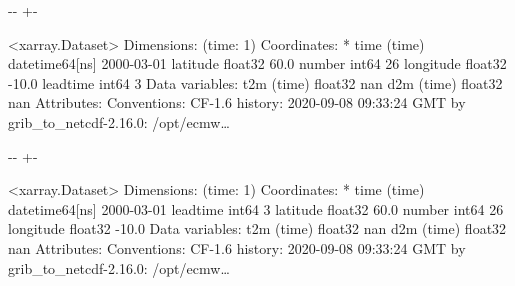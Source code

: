 \documentclass[letterpaper,10pt,english]{sphinxmanual}
\newlength\nbsphinxcodecellspacing
\begin{document}
{

\kern-\sphinxverbatimsmallskipamount\kern-\baselineskip
\kern+\FrameHeightAdjust\kern-\fboxrule
\vspace{\nbsphinxcodecellspacing}

\begin{sphinxVerbatim}[commandchars=\\\{\}]
\llap{\color{nbsphinxout}[29]:\,\hspace{\fboxrule}\hspace{\fboxsep}}<xarray.Dataset>
Dimensions:    (time: 1)
Coordinates:
  * time       (time) datetime64[ns] 2000-03-01
    latitude   float32 60.0
    number     int64 26
    longitude  float32 -10.0
    leadtime   int64 3
Data variables:
    t2m        (time) float32 nan
    d2m        (time) float32 nan
Attributes:
    Conventions:  CF-1.6
    history:      2020-09-08 09:33:24 GMT by grib\_to\_netcdf-2.16.0: /opt/ecmw{\ldots}
\end{sphinxVerbatim}
}

{

\kern-\sphinxverbatimsmallskipamount\kern-\baselineskip
\kern+\FrameHeightAdjust\kern-\fboxrule
\vspace{\nbsphinxcodecellspacing}

\begin{sphinxVerbatim}[commandchars=\\\{\}]
\llap{\color{nbsphinxout}[29]:\,\hspace{\fboxrule}\hspace{\fboxsep}}<xarray.Dataset>
Dimensions:    (time: 1)
Coordinates:
  * time       (time) datetime64[ns] 2000-03-01
    leadtime   int64 3
    latitude   float32 60.0
    number     int64 26
    longitude  float32 -10.0
Data variables:
    t2m        (time) float32 nan
    d2m        (time) float32 nan
Attributes:
    Conventions:  CF-1.6
    history:      2020-09-08 09:33:24 GMT by grib\_to\_netcdf-2.16.0: /opt/ecmw{\ldots}
\end{sphinxVerbatim}
}

{
\begin{sphinxVerbatim}[commandchars=\\\{\}]
\llap{\color{nbsphinxin}[10]:\,\hspace{\fboxrule}\hspace{\fboxsep}}       \PYG{p}{[}\PYG{p}{]}
\end{sphinxVerbatim}
}
\end{document}
